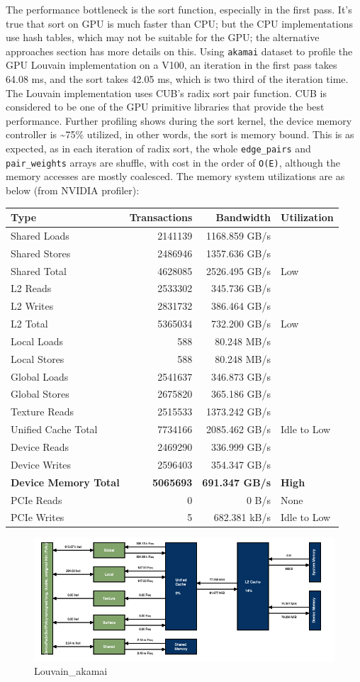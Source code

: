 \documentclass[10pt,article,oneside]{memoir}
\begin{document}
The performance bottleneck is the sort function, especially in the first
pass. It's true that sort on GPU is much faster than CPU; but the CPU
implementations use hash tables, which may not be suitable for the GPU;
the alternative approaches section has more details on this. Using
\texttt{akamai} dataset to profile the GPU Louvain implementation on a
V100, an iteration in the first pass takes 64.08 ms, and the sort takes
42.05 ms, which is two third of the iteration time. The Louvain
implementation uses CUB's radix sort pair function. CUB is considered to
be one of the GPU primitive libraries that provide the best performance.
Further profiling shows during the sort kernel, the device memory
controller is \textasciitilde{}75\% utilized, in other words, the sort
is memory bound. This is as expected, as in each iteration of radix
sort, the whole \texttt{edge\_pairs} and \texttt{pair\_weights} arrays
are shuffle, with cost in the order of
\texttt{O(\textbar{}E\textbar{})}, although the memory accesses are
mostly coalesced. The memory system utilizations are as below (from
NVIDIA profiler):

\begin{longtable}[c]{@{}lrrl@{}}
\toprule
Type & Transactions & Bandwidth & Utilization\tabularnewline
\midrule
\endhead
Shared Loads & 2141139 & 1168.859 GB/s &\tabularnewline
Shared Stores & 2486946 & 1357.636 GB/s &\tabularnewline
Shared Total & 4628085 & 2526.495 GB/s & Low\tabularnewline
L2 Reads & 2533302 & 345.736 GB/s &\tabularnewline
L2 Writes & 2831732 & 386.464 GB/s &\tabularnewline
L2 Total & 5365034 & 732.200 GB/s & Low\tabularnewline
Local Loads & 588 & 80.248 MB/s &\tabularnewline
Local Stores & 588 & 80.248 MB/s &\tabularnewline
Global Loads & 2541637 & 346.873 GB/s &\tabularnewline
Global Stores & 2675820 & 365.186 GB/s &\tabularnewline
Texture Reads & 2515533 & 1373.242 GB/s &\tabularnewline
Unified Cache Total & 7734166 & 2085.462 GB/s & Idle to
Low\tabularnewline
Device Reads & 2469290 & 336.999 GB/s &\tabularnewline
Device Writes & 2596403 & 354.347 GB/s &\tabularnewline
\textbf{Device Memory Total} & \textbf{5065693} & \textbf{691.347 GB/s}
& \textbf{High}\tabularnewline
PCIe Reads & 0 & 0 B/s & None\tabularnewline
PCIe Writes & 5 & 682.381 kB/s & Idle to Low\tabularnewline
\bottomrule
\end{longtable}

\begin{figure}[htbp]
\centering
\includegraphics{attachments/louvain/Louvain_akamai.png}
\caption{Louvain\_akamai}
\end{figure}
\end{document}
